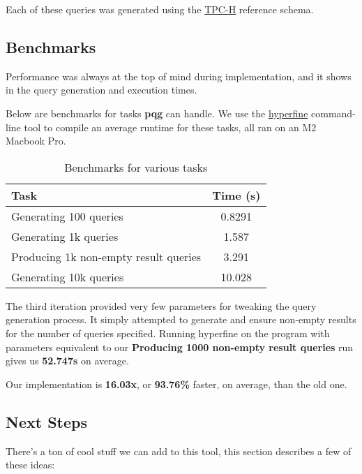 \documentclass[10pt, twocolumn]{article}
\begin{document}
\noindent
Each of these queries was generated using the \href{https://www.tpc.org/tpch/}{TPC-H} reference schema.

\subsection*{Benchmarks}

Performance was always at the top of mind during implementation, and it shows in the query generation and execution times.

\spacing
\noindent
Below are benchmarks for tasks \textbf{pqg} can handle. We use the \href{https://github.com/sharkdp/hyperfine}{hyperfine} command-line tool to compile an average runtime for these tasks, all ran on an M2 Macbook Pro.

\spacing
\begin{table}[h]
    \centering
    \begin{tabular}{|l|c|}
        \hline
        Task & Time (s) \\
        \hline
        Generating 100 queries & 0.8291 \\
        Generating 1k queries & 1.587  \\
        Producing 1k non-empty result queries & 3.291 \\
        Generating 10k queries & 10.028 \\
        \hline
    \end{tabular}
    \caption{Benchmarks for various tasks}
    \label{tab:benchmarks-table}
\end{table}

\spacing
\noindent
The third iteration provided very few parameters for tweaking the query generation process. It
simply attempted to generate and ensure non-empty results for the number of queries specified. Running hyperfine on the program with parameters equivalent to our \textbf{Producing 1000 non-empty result queries} run gives us \textbf{52.747s} on average.

\spacing
\noindent
Our implementation is \textbf{16.03x}, or \textbf{93.76\%} faster, on average, than the old one.

\subsection*{Next Steps}

There's a ton of cool stuff we can add to this tool, this section describes a few of these ideas:
\end{document}
